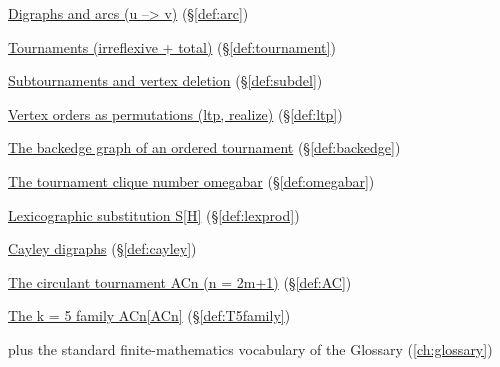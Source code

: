 \begin{closurepanel}
\item \hyperref[def:arc]{Digraphs and arcs (u --> v)} (\S\ref*{def:arc})
\item \hyperref[def:tournament]{Tournaments (irreflexive + total)} (\S\ref*{def:tournament})
\item \hyperref[def:subdel]{Subtournaments and vertex deletion} (\S\ref*{def:subdel})
\item \hyperref[def:ltp]{Vertex orders as permutations (ltp, realize)} (\S\ref*{def:ltp})
\item \hyperref[def:backedge]{The backedge graph of an ordered tournament} (\S\ref*{def:backedge})
\item \hyperref[def:omegabar]{The tournament clique number omegabar} (\S\ref*{def:omegabar})
\item \hyperref[def:lexprod]{Lexicographic substitution S[H]} (\S\ref*{def:lexprod})
\item \hyperref[def:cayley]{Cayley digraphs} (\S\ref*{def:cayley})
\item \hyperref[def:AC]{The circulant tournament ACn (n = 2m+1)} (\S\ref*{def:AC})
\item \hyperref[def:T5family]{The k = 5 family ACn[ACn]} (\S\ref*{def:T5family})
\item plus the standard finite-mathematics vocabulary of the Glossary (\cref{ch:glossary})
\end{closurepanel}
